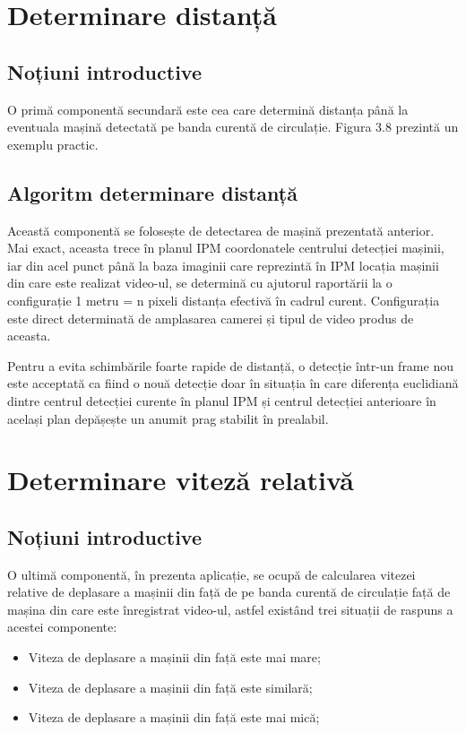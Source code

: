 \section{Determinare distanță}
\subsection*{Noțiuni introductive}

O primă componentă secundară este cea care determină distanța până la eventuala mașină detectată pe banda curentă de circulație. Figura 3.8 prezintă un exemplu practic.

\subsection*{Algoritm determinare distanță}

Această componentă se folosește de detectarea de mașină prezentată anterior. Mai exact, aceasta trece în planul IPM coordonatele centrului detecției mașinii, iar din acel punct până la baza imaginii care reprezintă în IPM locația mașinii din care este realizat video-ul, se determină cu ajutorul raportării la o configurație 1 metru = n pixeli distanța efectivă în cadrul curent. Configurația este direct determinată de amplasarea camerei și tipul de video produs de aceasta. 

Pentru a evita schimbările foarte rapide de distanță, o detecție într-un frame nou este acceptată ca fiind o nouă detecție doar în situația în care diferența euclidiană dintre centrul detecției curente în planul IPM și centrul detecției anterioare în același plan depășește un anumit prag stabilit în prealabil.

\section{Determinare viteză relativă}
\subsection*{Noțiuni introductive}

O ultimă componentă, în prezenta aplicație, se ocupă de calcularea vitezei relative de deplasare a mașinii din față de pe banda curentă de circulație față de mașina din care este înregistrat video-ul, astfel existând trei situații de raspuns a acestei componente:

\begin{itemize}
	\item Viteza de deplasare a mașinii din față este mai mare;
	\item Viteza de deplasare a mașinii din față este similară;
	\item Viteza de deplasare a mașinii din față este mai mică;
\end{itemize}

